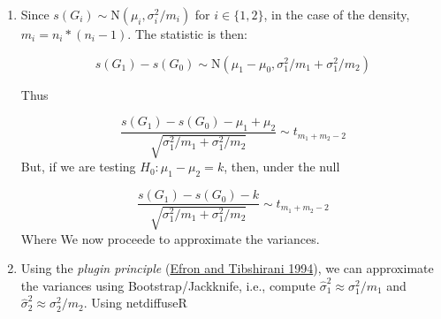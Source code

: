 \documentclass[
]{book}
\newenvironment{Shaded}{\begin{snugshade}}{\end{snugshade}}
\newcommand{\AttributeTok}[1]{\textcolor[rgb]{0.77,0.63,0.00}{#1}}
\newcommand{\CommentTok}[1]{\textcolor[rgb]{0.56,0.35,0.01}{\textit{#1}}}
\newcommand{\ControlFlowTok}[1]{\textcolor[rgb]{0.13,0.29,0.53}{\textbf{#1}}}
\newcommand{\DecValTok}[1]{\textcolor[rgb]{0.00,0.00,0.81}{#1}}
\newcommand{\FunctionTok}[1]{\textcolor[rgb]{0.00,0.00,0.00}{#1}}
\newcommand{\NormalTok}[1]{#1}
\newcommand{\OtherTok}[1]{\textcolor[rgb]{0.56,0.35,0.01}{#1}}
\newcommand{\SpecialCharTok}[1]{\textcolor[rgb]{0.00,0.00,0.00}{#1}}
\begin{document}
\begin{enumerate}
\def\labelenumi{\arabic{enumi}.}
\item
  Since \(s(G_i)\sim \mbox{N}(\mu_i,\sigma_i^2/m_i)\) for \(i\in\{1,2\}\), in the case
  of the density, \(m_i = n_i * (n_i - 1)\). The statistic is then:

  \[
  s(G_1) - s(G_0)\sim \mbox{N}(\mu_1-\mu_0, \sigma_1^2/m_1 + \sigma_1^2/m_2)
  \]

  Thus

  \[
  \frac{s(G_1) - s(G_0) - \mu_1 + \mu_2}{\sqrt{\sigma_1^2/{m_1} + \sigma_1^2/{m_2}}} \sim t_{m_1 + m_2 - 2}
  \]
  But, if we are testing \(H_0: \mu_1 - \mu_2 = k\), then, under the null

  \[
  \frac{s(G_1) - s(G_0) - k}{\sqrt{\sigma_1^2/{m_1} + \sigma_1^2/{m_2}}} \sim t_{m_1 + m_2 - 2}
  \]
  Where We now proceede to approximate the variances.
\item
  Using the \emph{plugin principle} (\protect\hyperlink{ref-Efron1994}{Efron and Tibshirani 1994}), we can approximate the variances
  using Bootstrap/Jackknife, i.e., compute \(\hat\sigma_1^2\approx\sigma_1^2/m_1\) and
  \(\hat\sigma_2^2\approx\sigma_2^2/m_2\). Using netdiffuseR

\begin{Shaded}
\end{Shaded}
\end{enumerate}
\end{document}
